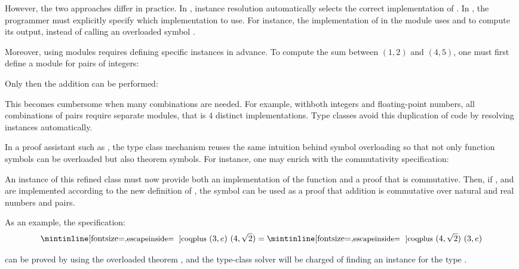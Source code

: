 However, the two approaches differ in practice. In \rocq, instance resolution
automatically selects the correct implementation of . In \ocaml, the
programmer must explicitly specify which implementation to use. For instance,
the implementation of  in the module
 uses  and 
to compute its output, instead of calling an overloaded symbol .

Moreover, using modules requires defining specific instances in advance. To
compute the sum between $(1,2)$ and $(4,5)$, one must first define a module for pairs of integers:

\begin{center}
  
\end{center}

Only then the addition can be performed:
\begin{center}
  
\end{center}

This becomes cumbersome when many combinations are needed. For example, withboth
integers and floating-point numbers, all combinations of pairs require separate
modules, that is $4$ distinct implementations. Type classes avoid this
duplication of code by resolving instances automatically.

\label{sec:th-overloading}

In a proof assistant such as \rocq, the type class
mechanism reuses the same intuition behind symbol overloading so that not only
function symbols can be overloaded but also theorem symbols.
For instance, one may enrich  with the commutativity specification:



An instance of this refined class must now provide both an implementation of the
function  and a proof that  is commutative. Then, if
,  and  are implemented according to the new
definition of , the  symbol can be used as a proof that
addition is commutative over natural and real numbers and pairs.

As an example, the specification:
%
$$\cI{plus}\ (3, e)\ (4, \sqrt{2}) = \cI{plus}\ (4, \sqrt{2})\ (3, e)$$

\noindent
can be proved by using the overloaded theorem , and the type-class solver
will be charged of finding an instance for the type .

